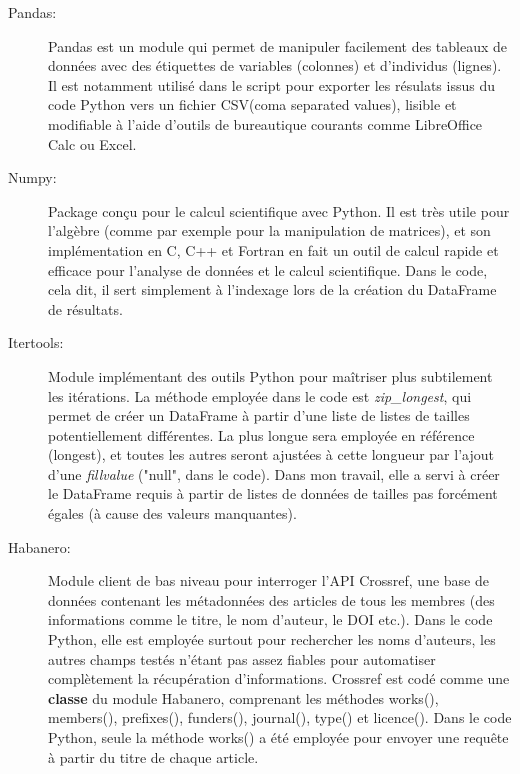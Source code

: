 \documentclass{book}
\begin{document}
\begin{description}
    \item[Pandas:] Pandas est un module qui permet de manipuler facilement des
        tableaux de données avec des étiquettes de variables (colonnes) et d'individus
        (lignes). Il est notamment utilisé dans le script pour exporter les résulats
        issus du code Python vers un fichier CSV(coma separated values), lisible et
        modifiable à l'aide d'outils de bureautique courants comme LibreOffice Calc ou
        Excel.

    \item[Numpy:] Package conçu pour le calcul scientifique avec Python. Il est
        très utile pour l'algèbre (comme par exemple pour la manipulation de matrices),
        et son implémentation en C, C++ et Fortran en fait un outil de calcul rapide et
        efficace pour l'analyse de données et le calcul scientifique. Dans le code,
        cela dit, il sert simplement à l'indexage lors de la création du DataFrame de
        résultats.

    \item[Itertools:] Module implémentant des outils Python pour maîtriser plus
        subtilement les itérations. La méthode employée dans le code est
        \textit{zip\_longest}, qui permet de créer un DataFrame à partir d'une liste de
        listes de tailles potentiellement différentes. La plus longue sera employée en
        référence (longest), et toutes les autres seront ajustées à cette longueur par
        l'ajout d'une \textit{fillvalue} ("null", dans le code). Dans mon travail, elle
        a servi à créer le DataFrame requis à partir de listes de données de tailles
        pas forcément égales (à cause des valeurs manquantes).

    \item[Habanero:] Module client de bas niveau pour interroger l'API
        Crossref, une base de données contenant les métadonnées des articles de tous les
        membres (des informations comme le titre, le nom d'auteur, le DOI etc.). Dans
        le code Python, elle est employée surtout pour rechercher les noms d'auteurs,
        les autres champs testés n'étant pas assez fiables pour automatiser
        complètement la récupération d'informations. Crossref est codé comme une
        \textbf{classe} du module Habanero, comprenant les méthodes works(), members(),
        prefixes(), funders(), journal(), type() et licence(). Dans le code Python,
        seule la méthode works() a été employée pour envoyer une requête à partir du
        titre de chaque article.


\end{description}
\end{document}
